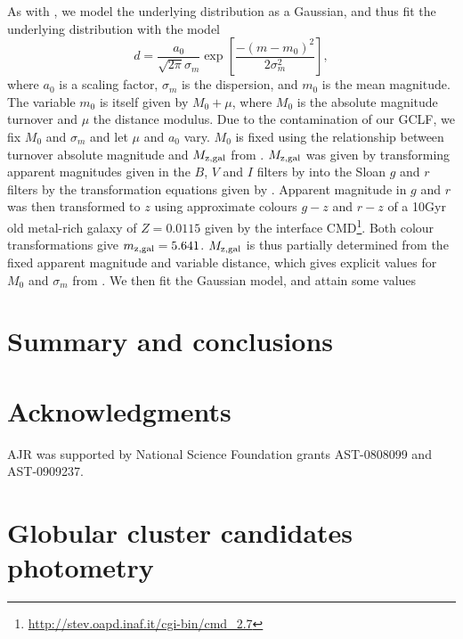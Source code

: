 \documentclass[useAMS,usenatbib]{mn2e}
\begin{document}
As with \citet{Salinas2015}, we model the underlying distribution as a  Gaussian, and thus fit the underlying distribution with the model
\begin{equation}
d = \frac{a_0}{\sqrt{2\pi} \sigma_m} \exp\left[\frac{-(m-m_0)^2}{2 \sigma_m^2}\right],
\end{equation}
where $a_0$ is a scaling factor, $\sigma_m$ is the dispersion, and $m_0$ is the mean magnitude. The variable $m_0$ is itself given by $M_0 + \mu$, where $M_0$ is the absolute magnitude turnover and $\mu$ the distance modulus. Due to the contamination of our GCLF, we fix $M_0$ and $\sigma_m$ and let $\mu$ and $a_0$ vary. $M_0$ is fixed using the relationship between turnover absolute magnitude and $M_{\rm{z,gal}}$ from \citet{Villegas2010}. $M_{\rm{z,gal}}$ was given by transforming apparent magnitudes given in the $B$, $V$ and $I$ filters by \citet{Fingerhut2003} into the Sloan $g$ and $r$ filters by the transformation equations given by \citet{Jester2005}. Apparent magnitude in $g$ and $r$ was then transformed to $z$ using approximate colours $g-z$ and $r-z$ of a 10Gyr old metal-rich galaxy of $Z=0.0115$ given by the interface CMD\footnote{\url{http://stev.oapd.inaf.it/cgi-bin/cmd_2.7}}. Both colour transformations give $m_{\rm{z,gal}} = 5.641$. $M_{\rm{z,gal}}$ is thus partially determined from the fixed apparent magnitude and variable distance, which gives explicit values for $M_0$ and $\sigma_m$ from \citet{Villegas2010}. We then fit the Gaussian model, and attain {\color{red} some values}

\section{Summary and conclusions}
\label{sec:conclusions}

\lipsum[1-2]

\section*{Acknowledgments}

AJR was supported by National Science Foundation grants AST-0808099
and AST-0909237.




\appendix
\onecolumn
\section{Globular cluster candidates photometry}
\label{sec:appendix}
\end{document}
